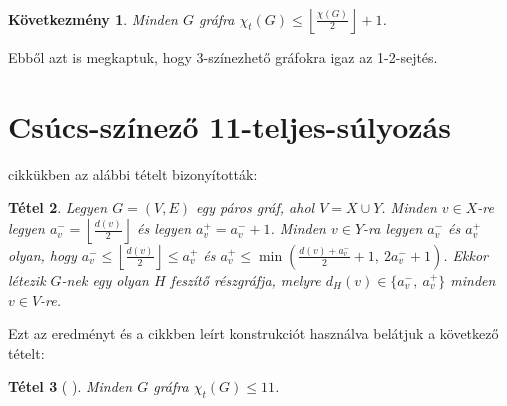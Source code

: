 \documentclass[12pt, a4paper]{report}
\newtheorem{tét}{Tétel}[section]
\newtheorem{köv}[tét]{Következmény}
\theoremstyle{remark}
\theoremstyle{definition}
\begin{document}
\begin{köv} \label{cor:totalchromatic}
Minden $G$ gráfra $\chi_t(G) \leq \left\lfloor \frac{\chi(G)}{2} \right\rfloor + 1$.
\end{köv}

Ebből azt is megkaptuk, hogy $3$-színezhető gráfokra igaz az 1-2-sejtés.

\section{Csúcs-színező 11-teljes-súlyozás}
\citeauthor{AddarioBerry2008} \cite{AddarioBerry2008} cikkükben az alábbi tételt bizonyították:

\begin{tét} \label{thm:degreeconstbipartite}
Legyen $G=(V, E)$ egy páros gráf, ahol $V = X \cup Y$. Minden $v \in X$-re legyen $a_v^- = \left\lfloor \frac{d(v)}{2} \right\rfloor$ és legyen $a_v^+ = a_v^- + 1$. Minden $v \in Y$-ra legyen $a_v^-$ és $a_v^+$ olyan, hogy $a_v^- \leq \left\lfloor \frac{d(v)}{2} \right\rfloor \leq a_v^+$ és $a_v^+ \leq \min \left( \frac{d(v) + a_v^-}{2} + 1,\ 2a_v^- + 1 \right)$. Ekkor létezik $G$-nek egy olyan $H$ feszítő részgráfja, melyre $d_H(v) \in \lbrace a_v^-,\ a_v^+ \rbrace$ minden $v \in V$-re.
\end{tét}

Ezt az eredményt és a cikkben leírt konstrukciót használva belátjuk a következő tételt:

\begin{tét}[\citeauthor{Przybylo2010} \cite{Przybylo2010}]
Minden $G$ gráfra $\chi_t(G) \leq 11$.
\end{tét}
\end{document}

